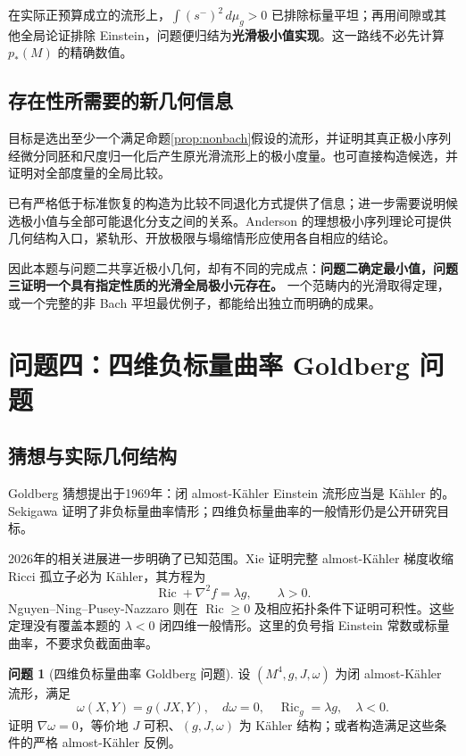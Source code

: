 \documentclass[11pt,a4paper]{article}
\newcommand{\Ric}{\operatorname{Ric}}
\newcommand{\dd}{\,d\mu_g}
\newcommand{\Ka}{K{\latin\"a}hler}
\theoremstyle{definition}
\newtheorem{problem}{问题}[section]
\numberwithin{equation}{section}
\begin{document}
在实际正预算成立的流形上，$\int(s^-)^2\dd>0$ 已排除标量平坦；再用间隙或其他全局论证排除 Einstein，问题便归结为\textbf{光滑极小值实现}。这一路线不必先计算 $p_*(M)$ 的精确数值。

\subsection{存在性所需要的新几何信息}
目标是选出至少一个满足命题\ref{prop:nonbach}假设的流形，并证明其真正极小序列经微分同胚和尺度归一化后产生原光滑流形上的极小度量。也可直接构造候选，并证明对全部度量的全局比较。

已有严格低于标准恢复的构造为比较不同退化方式提供了信息；进一步需要说明候选极小值与全部可能退化分支之间的关系。Anderson 的理想极小序列理论可提供几何结构入口，紧轨形、开放极限与塌缩情形应使用各自相应的结论\cite{Anderson}。

因此本题与问题二共享近极小几何，却有不同的完成点：\textbf{问题二确定最小值，问题三证明一个具有指定性质的光滑全局极小元存在。} 一个范畴内的光滑取得定理，或一个完整的非 Bach 平坦最优例子，都能给出独立而明确的成果。

\section{问题四：四维负标量曲率 Goldberg 问题}
\label{sec:goldberg}

\subsection{猜想与实际几何结构}
Goldberg 猜想提出于1969年：闭 almost-\Ka{} Einstein 流形应当是 \Ka{} 的。Sekigawa 证明了非负标量曲率情形；四维负标量曲率的一般情形仍是公开研究目标\cite{Goldberg,Sekigawa,Cochran}。

2026年的相关进展进一步明确了已知范围。Xie 证明完整 almost-\Ka{} 梯度收缩 Ricci 孤立子必为 \Ka{}，其方程为
\[
\Ric+\nabla^2f=\lambda g,\qquad\lambda>0.
\]
Nguyen--Ning--Pusey-Nazzaro 则在 $\Ric\ge0$ 及相应拓扑条件下证明可积性\cite{Xie2026,Nguyen2026}。这些定理没有覆盖本题的 $\lambda<0$ 闭四维一般情形。这里的负号指 Einstein 常数或标量曲率，不要求负截面曲率。

\begin{problem}[四维负标量曲率 Goldberg 问题]
设 $(M^4,g,J,\omega)$ 为闭 almost-\Ka{} 流形，满足
\[
\omega(X,Y)=g(JX,Y),\quad d\omega=0,\quad
\Ric_g=\lambda g,\quad\lambda<0.
\]
证明 $\nabla\omega=0$，等价地 $J$ 可积、$(g,J,\omega)$ 为 \Ka{} 结构；或者构造满足这些条件的严格 almost-\Ka{} 反例。
\end{problem}
\end{document}
